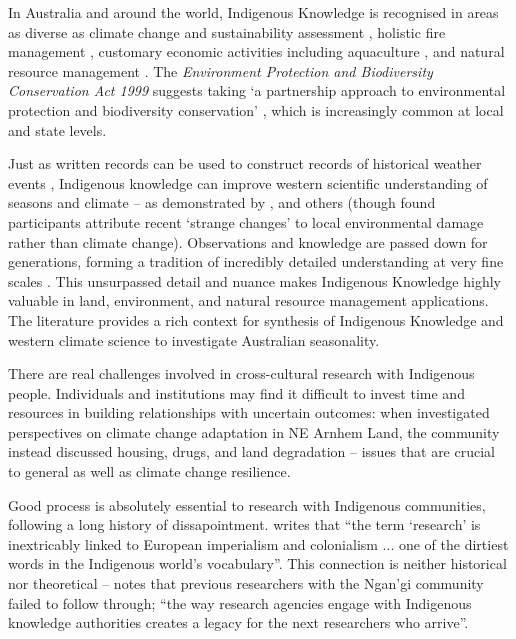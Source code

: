 In Australia and around the world, Indigenous Knowledge is recognised
in areas as diverse as climate change and sustainability assessment
\citep[eg.][]{cochran2015}, holistic fire management \citep[eg.][]{clarke2009,price2012},
customary economic activities including aquaculture \citep{woodward2012a}, and
natural resource management \citep[eg.][]{prober2011}.  The \textit{Environment
Protection and Biodiversity Conservation Act 1999} suggests taking `a
partnership approach to environmental protection and biodiversity conservation'
\citep{ens2012}, which is increasingly common at local and state levels.


Just as written records can be used to construct records of historical weather
events \citep[eg.][]{rodrigo1999}, Indigenous knowledge can improve western
scientific understanding of seasons and climate -- as demonstrated by
\citet{green2010a,clarke2009}, and others (though \citet{green2010a} found
participants attribute recent `strange changes' to local environmental damage
rather than climate change).
%
Observations and knowledge are passed down for generations, forming a
tradition of incredibly detailed understanding at very fine scales \citep{barber2005}.
This unsurpassed detail and nuance makes Indigenous Knowledge highly valuable
in land, environment, and natural resource management applications.
The literature provides a rich context for synthesis of Indigenous Knowledge
and western climate science to investigate Australian seasonality.


There are real challenges involved in cross-cultural research with
Indigenous people.  Individuals and institutions may find it difficult to
invest time and resources in building relationships with uncertain outcomes:
when \citet{petheram2010}
investigated perspectives on climate change adaptation in NE Arnhem Land,
the community instead discussed housing, drugs, and land degradation -- issues
that are crucial to general as well as climate change resilience.

Good process is absolutely essential to research with Indigenous communities,
following a long history of dissapointment.  \citet{smith1999} writes that ``the term
`research' is inextricably linked to European imperialism and colonialism ...
one of the dirtiest words in the Indigenous world's vocabulary''. This
connection is neither historical nor theoretical -- \citet{woodward2010} notes
that previous researchers with the Ngan'gi community failed to follow through;
``the way research agencies engage with Indigenous knowledge authorities
creates a legacy for the next researchers who arrive''.


